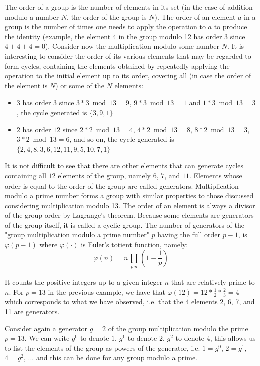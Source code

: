 The order of a group is the number of elements in its set (in the case of addition modulo a number $N$, the order of the group is $N$). The order of an element $a$ in a group is the number of times one needs to apply the operation to $a$ to produce the identity (example, the element 4 in the group modulo 12 has order 3 since $4+4+4=0$).
Consider now the multiplication modulo some number $N$. It is interesting to consider the order of its various elements that may be regarded to form cycles, containing the elements obtained by repeatedly applying the operation to the initial element up to its order, covering all (in case the order of the element is $N$) or some of the $N$ elements:
\begin{itemize}
		\item $3$ has order $3$ since $3*3 \bmod 13 = 9$, $9*3 \bmod 13 = 1$ and $1*3 \bmod 13 = 3$, the cycle generated is $\{ 3, 9, 1 \}$
	\item $2$ has order $12$ since $2*2 \bmod 13 = 4$, $4*2 \bmod 13 = 8$, $8*2 \bmod 13 = 3$, $3*2 \bmod 13 = 6$, and so on, the cycle generated is $\{ 2, 4, 8, 3, 6, 12, 11, 9, 5, 10, 7, 1 \}$
\end{itemize}

It is not difficult to see that there are other elements that can generate cycles containing all $12$ elements of the group, namely $6$, $7$, and $11$. Elements whose order is equal to the order of the group are called generators.
Multiplication modulo a prime number forms a group with similar properties to those discussed considering multiplication modulo 13. The order of an element is always a divisor of the group order by Lagrange's theorem. Because some elements are generators of the group itself, it is called a cyclic group. The number of generators of the "group multiplication modulo a prime number" $p$ having the full order $p - 1$, is $\varphi(p-1)$ where $\varphi(\cdot)$ is Euler's totient function, namely:
\[\varphi(n) = n \prod_{p|n}^{} (1- \frac{1}{p})\]

It counts the positive integers up to a given integer $n$ that are relatively prime to $n$. For $p=13$ in the previous example, we have that $\varphi(12) = 12 * \frac{1}{2} * \frac{2}{3} = 4$ which corresponds to what we have observed, i.e. that the 4 elements 2, 6, 7, and 11 are generators.

Consider again a generator $g=2$ of the group multiplication modulo the prime $p=13$. We can write $g^0$ to denote $1$, $g^1$ to denote $2$, $g^2$ to denote $4$, this allows us to list the elements of the group as powers of the generator, i.e. $1=g^0$, $2=g^1$, $4=g^2$, ... and this can be done for any group modulo a prime.

